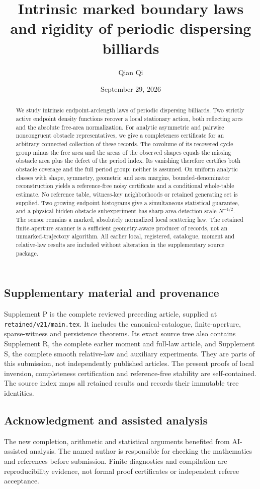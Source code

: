 \documentclass[11pt]{amsart}
\title[Intrinsic marked boundary laws]{Intrinsic marked boundary laws and rigidity of periodic dispersing billiards}
\author{Qian Qi}\date{September 29, 2026}
\theoremstyle{definition}\newtheorem{definition}[theorem]{Definition}
\theoremstyle{remark}\newtheorem{remark}[theorem]{Remark}
\numberwithin{equation}{section}
\begin{document}
\begin{abstract}
We study intrinsic endpoint-arclength laws of periodic dispersing billiards.
Two strictly active endpoint density functions recover a local stationary
action, both reflecting arcs and the absolute free-area normalization.
For analytic asymmetric and pairwise noncongruent obstacle representatives,
we give a completeness certificate for an arbitrary connected collection
of these records. The covolume of its recovered cycle group minus the
free area and the areas of the observed shapes equals the missing
obstacle area plus the defect of the period index. Its vanishing therefore
certifies both obstacle coverage and the full period group; neither is
assumed. On uniform analytic classes with shape, symmetry, geometric and
area margins, bounded-denominator reconstruction yields a reference-free
noisy certificate and a conditional whole-table estimate. No reference
table, witness-key neighborhoods or retained generating set is supplied.
Two growing endpoint histograms give a simultaneous statistical guarantee,
and a physical hidden-obstacle subexperiment has sharp area-detection
scale $N^{-1/2}$. The sensor remains a marked, absolutely normalized local
scattering law. The retained finite-aperture scanner is a sufficient
geometry-aware producer of records, not an unmarked-trajectory algorithm.
All earlier local, registered, catalogue, moment and relative-law results
are included without alteration in the supplementary source package.
\end{abstract}
\maketitle






\subsection*{Supplementary material and provenance}
Supplement P is the complete reviewed preceding article, supplied at
\texttt{retained/v21/main.tex}. It includes the canonical-catalogue,
finite-aperture, sparse-witness and persistence theorems. Its exact source
tree also contains Supplement R, the complete earlier moment and full-law
article, and Supplement S, the complete smooth relative-law and auxiliary
experiments. They are parts of this submission, not independently published
articles. The present proofs of local inversion, completeness certification
and reference-free stability are self-contained. The source index maps all
retained results and records their immutable tree identities.
\subsection*{Acknowledgment and assisted analysis}
The new completion, arithmetic and statistical arguments benefited from
AI-assisted analysis.
The named author is responsible for checking the mathematics and references
before submission. Finite diagnostics and compilation are reproducibility
evidence, not formal proof certificates or independent referee acceptance.

\end{document}
